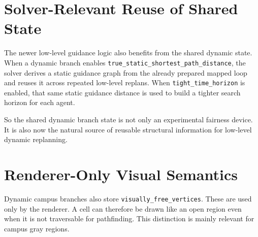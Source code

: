 \documentclass[11pt]{article}
\begin{document}
\section{Solver-Relevant Reuse of Shared State}

The newer low-level guidance logic also benefits from the shared dynamic state. When a dynamic branch enables \texttt{true\_static\_shortest\_path\_distance}, the solver derives a static guidance graph from the already prepared mapped loop and reuses it across repeated low-level replans. When \texttt{tight\_time\_horizon} is enabled, that same static guidance distance is used to build a tighter search horizon for each agent.

So the shared dynamic branch state is not only an experimental fairness device. It is also now the natural source of reusable structural information for low-level dynamic replanning.

\section{Renderer-Only Visual Semantics}

Dynamic campus branches also store \texttt{visually\_free\_vertices}. These are used only by the renderer. A cell can therefore be drawn like an open region even when it is not traversable for pathfinding. This distinction is mainly relevant for campus gray regions.
\end{document}
